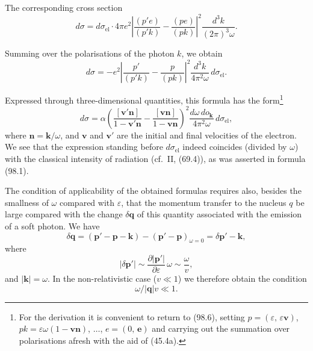 
The corresponding cross section
\begin{equation}
d\sigma = d\sigma_\text{el}\cdot 4\pi e^2\left|\frac{(p'e)}{(p'k)} - \frac{(pe)}{(pk)}\right|^2\frac{d^3k}{(2\pi)^3\omega}.
\label{eq:98.6}
\end{equation}

Summing over the polarisations of the photon $k$, we obtain
\begin{equation}
d\sigma = -e^2\left|\frac{p'}{(p'k)} - \frac{p}{(pk)}\right|^2\frac{d^3k}{4\pi^2\omega}\,d\sigma_\text{el}.
\label{eq:98.7}
\end{equation}

Expressed through three-dimensional quantities, this formula has the form\footnote{For the derivation it is convenient to return to (98.6), setting $p = (\varepsilon,\,\varepsilon\mathbf{v})$, $pk = \varepsilon\omega(1 - \mathbf{v}\mathbf{n})$, $\ldots$, $e = (0,\,\mathbf{e})$ and carrying out the summation over polarisations afresh with the aid of (45.4a).}
\begin{equation}
d\sigma = \alpha\!\left(\frac{[\mathbf{v}'\mathbf{n}]}{1 - \mathbf{v}'\mathbf{n}} - \frac{[\mathbf{v}\mathbf{n}]}{1 - \mathbf{v}\mathbf{n}}\right)^{\!2}\frac{d\omega\,do_\mathbf{k}}{4\pi^2\omega}\,d\sigma_\text{el},
\label{eq:98.8}
\end{equation}
where $\mathbf{n} = \mathbf{k}/\omega$, and $\mathbf{v}$ and $\mathbf{v}'$ are the initial and final velocities of the electron. We see that the expression standing before $d\sigma_\text{el}$ indeed coincides (divided by $\omega$) with the classical intensity of radiation (cf.\ II, (69.4)), as was asserted in formula (98.1).

The condition of applicability of the obtained formulas requires also, besides the smallness of $\omega$ compared with $\varepsilon$, that the momentum transfer to the nucleus $q$ be large compared with the change $\delta\mathbf{q}$ of this quantity associated with the emission of a soft photon. We have
\[
\delta\mathbf{q} = (\mathbf{p}' - \mathbf{p} - \mathbf{k}) - (\mathbf{p}' - \mathbf{p})_{\omega=0} = \delta\mathbf{p}' - \mathbf{k},
\]
where
\[
|\delta\mathbf{p}'| \sim \frac{\partial|\mathbf{p}'|}{\partial\varepsilon}\,\omega \sim \frac{\omega}{v},
\]
and $|\mathbf{k}| = \omega$. In the non-relativistic case ($v \ll 1$) we therefore obtain the condition
\begin{equation}
\omega/|\mathbf{q}|v \ll 1.
\label{eq:98.9}
\end{equation}

